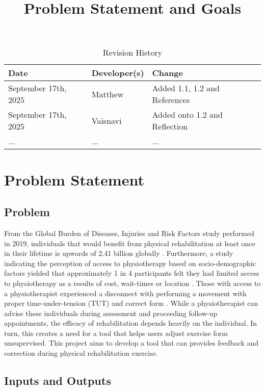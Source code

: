 \documentclass{article}
\title{Problem Statement and Goals\\\progname}
\author{\authname}
\date{}
\begin{document}
\maketitle

\begin{table}[hp]
\caption{Revision History} \label{TblRevisionHistory}
\begin{tabularx}{\textwidth}{llX}
\toprule
\textbf{Date} & \textbf{Developer(s)} & \textbf{Change}\\
\midrule
September 17th, 2025 & Matthew & Added 1.1, 1.2 and References\\
September 17th, 2025 & Vaisnavi & Added onto 1.2 and Reflection\\
... & ... & ...\\
\bottomrule
\end{tabularx}
\end{table}

\section{Problem Statement}

\subsection{Problem}

From the Global Burden of Diseases, Injuries and Risk Factors study performed in 2019, 
individuals that would benefit from physical rehabilitation at least once in their 
lifetime is upwards of 2.41 billion globally \citep{CiezaEtAl2021}.
Furthermore, a study indicating the perception of access to physiotherapy based on 
socio-demographic factors yielded that approximately 1 in 4 participants 
felt they had limited access to physiotherapy as a results of cost, wait-times or 
location \citep{BathEtAl2016}. Those with access to a physiotherapist experienced a 
disconnect with performing a movement with proper time-under-tension (TUT) and 
correct form \citep{FaberEtAl2015}. While a physiotherapist can advise these individuals
during assessment and proceeding follow-up appointments, the efficacy of rehabilitation
depends heavily on the individual. In turn, this creates a need for a tool that helps users 
adjust exercise form unsupervised. This project aims to develop a tool that can 
provides feedback and correction during physical rehabilitation exercise.

\subsection{Inputs and Outputs}
\end{document}
